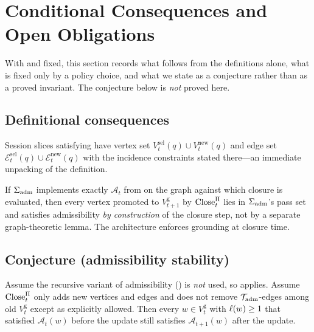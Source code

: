 \section{Conditional Consequences and Open Obligations}
\label{sec:theoretical}

With  and  fixed, this section records what follows from the definitions alone, what is fixed only by a policy choice, and what we state as a conjecture rather than as a proved invariant.
The conjecture below is \emph{not} proved here.

\subsection{Definitional consequences}
\label{sec:th-definitional}

Session slices satisfying  have vertex set $V^{\mathrm{sel}}_t(q)\cup V^{\mathrm{new}}_t(q)$ and edge set $\mathcal{E}^{\mathrm{sel}}_t(q)\cup \mathcal{E}^{\mathrm{new}}_t(q)$ with the incidence constraints stated there---an immediate unpacking of the definition.

\begin{remark}
\label{rem:adm-gate}
If $\Sigma_{\mathrm{adm}}$ implements exactly $\mathcal{A}_t$ from  on the graph against which closure is evaluated, then every vertex promoted to $V^{\mathrm{g}}_{t+1}$ by $\mathrm{Close}_t^{\Pi}$ lies in $\Sigma_{\mathrm{adm}}$'s pass set and satisfies admissibility \emph{by construction} of the closure step, not by a separate graph-theoretic lemma.
The architecture enforces grounding at closure time.
\end{remark}

\subsection{Conjecture (admissibility stability)}
\label{sec:th-conjecture}

\begin{conjecture}
\label{conj:close-preserve}
Assume the recursive variant of admissibility () is \emph{not} used, so  applies.
Assume $\mathrm{Close}_t^{\Pi}$ only adds new vertices and edges and does not remove $\mathcal{T}_{\mathrm{adm}}$-edges among old $V^{\mathrm{g}}_t$ except as explicitly allowed.
Then every $w\in V^{\mathrm{g}}_t$ with $\ell(w)\ge 1$ that satisfied $\mathcal{A}_t(w)$ before the update still satisfies $\mathcal{A}_{t+1}(w)$ after the update.
\end{conjecture}

